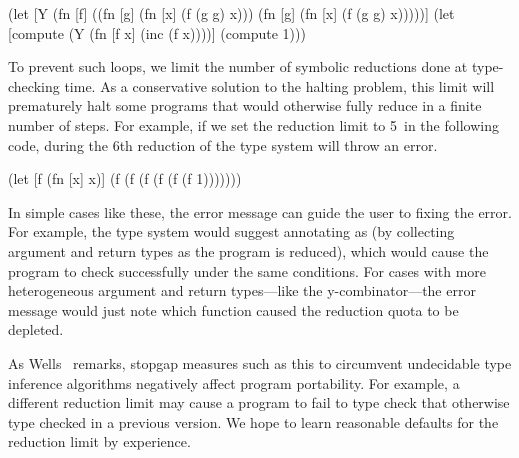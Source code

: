 \begin{cljlisting}
(let [Y (fn [f]
          ((fn [g] (fn [x] (f (g g) x)))
           (fn [g] (fn [x] (f (g g) x)))))]
  (let [compute (Y (fn [f x] (inc (f x))))]
    (compute 1)))
\end{cljlisting}

To prevent such loops, we limit the number of symbolic reductions
done at type-checking time.
As a conservative solution to the halting
problem, this limit will prematurely halt some programs that would
otherwise fully reduce in a finite number of steps.
For example, if we set the reduction limit to 5\ in
the following code,
during the 6th reduction of  the type system will
throw an error.

\begin{cljlisting}
(let [f (fn [x] x)]
  (f (f (f (f (f (f 1)))))))
\end{cljlisting}

In simple cases like these, the error message 
can guide the user to fixing the error.
For example, the type system would suggest 
annotating  as  (by collecting
argument and return types as the program is reduced),
which would cause the program to check successfully
under the same conditions.
For cases with more heterogeneous argument and return types---like the y-combinator---the 
error message would just note which function caused
the reduction quota to be depleted.

As Wells~\cite{wells1994typability} remarks,
stopgap measures such as this to circumvent undecidable
type inference algorithms negatively affect
program portability.
For example, a different reduction limit may cause
a program to fail to type check that otherwise type checked
in a previous version.
We hope to learn reasonable defaults for the reduction limit
by experience.


